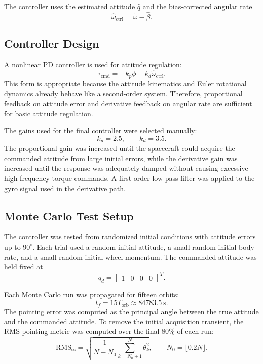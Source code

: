 The controller uses the estimated attitude \(\hat q\) and the bias-corrected angular
rate
\begin{equation}
    \hat{\omega}_{\mathrm{ctrl}}
    =
    \tilde{\omega}
    -
    \hat{\beta}.
\end{equation}

\subsection{Controller Design}

A nonlinear PD controller is used for attitude regulation:
\begin{equation}
    \tau_{\mathrm{cmd}}
    =
    -k_p\phi
    -
    k_d\hat{\omega}_{\mathrm{ctrl}}.
\end{equation}
This form is appropriate because the attitude kinematics and Euler rotational dynamics
already behave like a second-order system.
Therefore, proportional feedback on attitude error and derivative feedback on angular
rate are sufficient for basic attitude regulation.

The gains used for the final controller were selected manually:
\begin{equation}
    k_p = 2.5,
    \qquad
    k_d = 3.5.
\end{equation}
The proportional gain was increased until the spacecraft could acquire the commanded
attitude from large initial errors, while the derivative gain was increased until the
response was adequately damped without causing excessive high-frequency torque
commands. A first-order low-pass filter was applied to the gyro signal used in the
derivative path.

\subsection{Monte Carlo Test Setup}

The controller was tested from randomized initial conditions with attitude errors up
to \(90^\circ\). Each trial used a random initial attitude, a small random initial
body rate, and a small random initial wheel momentum. The commanded attitude was held
fixed at
\begin{equation}
    q_d =
    \begin{bmatrix}
        1 & 0 & 0 & 0
    \end{bmatrix}^T .
\end{equation}

Each Monte Carlo run was propagated for fifteen orbits:
\begin{equation}
    t_f = 15T_{\mathrm{orb}}
    \approx 84783.5~\mathrm{s}.
\end{equation}
The pointing error was computed as the principal angle between the true attitude and
the commanded attitude. To remove the initial acquisition transient, the RMS pointing
metric was computed over the final \(80\%\) of each run:
\begin{equation}
    \mathrm{RMS}_{\mathrm{ss}}
    =
    \sqrt{
        \frac{1}{N-N_0}
        \sum_{k=N_0+1}^{N}
        \theta_k^2
    },
    \qquad
    N_0 = \lfloor 0.2N \rfloor .
\end{equation}

